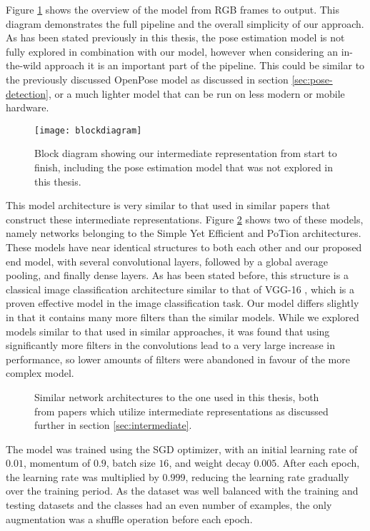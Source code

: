 Figure \ref{fig:block-diagram} shows the overview of the model from RGB frames to output. This diagram demonstrates the full pipeline and the overall simplicity of our approach. As has been stated previously in this thesis, the pose estimation model is not fully explored in combination with our model, however when considering an in-the-wild approach it is an important part of the pipeline. This could be similar to the previously discussed OpenPose \cite{openpose} model as discussed in section \ref{sec:pose-detection}, or a much lighter model that can be run on less modern or mobile hardware.

\begin{figure}[H]
	\texttt{[image: blockdiagram]}
	\centering
	\caption{Block diagram showing our intermediate representation from start to finish, including the pose estimation model that was not explored in this thesis.}
	\label{fig:block-diagram}
\end{figure}

This model architecture is very similar to that used in similar papers that construct these intermediate representations. Figure \ref{fig:similar-models} shows two of these models, namely networks belonging to the Simple Yet Efficient \cite{simple_yet_efficient} and PoTion \cite{potion} architectures. These models have near identical structures to both each other and our proposed end model, with several convolutional layers, followed by a global average pooling, and finally dense layers. As has been stated before, this structure is a classical image classification architecture similar to that of VGG-16 \cite{vgg16}, which is a proven effective model in the image classification task. Our model differs slightly in that it contains many more filters than the similar models. While we explored models similar to that used in similar approaches, it was found that using significantly more filters in the convolutions lead to a very large increase in performance, so lower amounts of filters were abandoned in favour of the more complex model.

\begin{figure}[ht]
	\centering
	\caption{Similar network architectures to the one used in this thesis, both from papers which utilize intermediate representations as discussed further in section \ref{sec:intermediate}.}
	\label{fig:similar-models}
\end{figure}

The model was trained using the SGD optimizer, with an initial learning rate of $0.01$, momentum of $0.9$, batch size $16$, and weight decay $0.005$. After each epoch, the learning rate was multiplied by $0.999$, reducing the learning rate gradually over the training period. As the dataset was well balanced with the training and testing datasets and the classes had an even number of examples, the only augmentation was a shuffle operation before each epoch.